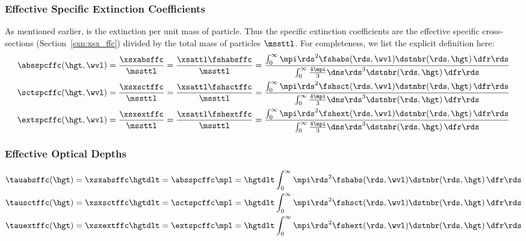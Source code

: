\documentclass[12pt]{article}
\begin{document}
\subsubsection[Effective Specific Extinction Coefficients]{Effective Specific Extinction Coefficients}\label{sxn:mac_ffc}
As mentioned earlier,  is the extinction
per unit mass of particle.
Thus the specific extinction coefficients are the effective specific
cross-sections (Section~\ref{sxn:xsx_ffc}) divided by the total mass
of particles $\mssttl$.
For completeness, we list the explicit definition here:
\begin{subequations}
\label{eqn:spc_ffc}
\begin{align}
\label{eqn:abs_spc_ffc}
\absspcffc(\hgt,\wvl) & = \frac{\xsxabsffc}{\mssttl} = 
\frac{\xsattl \fshabsffc}{\mssttl} =
\frac{\int_{0}^{\infty}
\mpi \rds^{2} \fshabs(\rds,\wvl) \dstnbr(\rds,\hgt) \,\dfr\rds}
{\int_{0}^{\infty}
\frac{4\mpi}{3} \dns \rds^{3} \dstnbr(\rds,\hgt) \,\dfr\rds} \\
\label{eqn:sct_spc_ffc}
\sctspcffc(\hgt,\wvl) & = \frac{\xsxsctffc}{\mssttl} = 
\frac{\xsattl \fshsctffc}{\mssttl} =
\frac{\int_{0}^{\infty}
\mpi \rds^{2} \fshsct(\rds,\wvl) \dstnbr(\rds,\hgt) \,\dfr\rds}
{\int_{0}^{\infty}
\frac{4\mpi}{3} \dns \rds^{3} \dstnbr(\rds,\hgt) \,\dfr\rds} \\
\label{eqn:ext_spc_ffc}
\extspcffc(\hgt,\wvl) & = \frac{\xsxextffc}{\mssttl} = 
\frac{\xsattl \fshextffc}{\mssttl} =
\frac{\int_{0}^{\infty}
\mpi \rds^{2} \fshext(\rds,\wvl) \dstnbr(\rds,\hgt) \,\dfr\rds}
{\int_{0}^{\infty}
\frac{4\mpi}{3} \dns \rds^{3} \dstnbr(\rds,\hgt) \,\dfr\rds}
\end{align}
\end{subequations}

\subsubsection[Effective Optical Depths]{Effective Optical Depths}\label{sxn:tau_ffc}
\begin{subequations}
\label{eqn:tau_ffc}
\begin{align}
\label{eqn:tau_abs_ffc}
\tauabsffc(\hgt) & = \xsxabsffc \hgtdlt = \absspcffc \mpl =
\hgtdlt \int_{0}^{\infty}
\mpi \rds^{2} \fshabs(\rds,\wvl) \dstnbr(\rds,\hgt) \,\dfr\rds \\
\label{eqn:tau_sct_ffc}
\tausctffc(\hgt) & = \xsxsctffc \hgtdlt = \sctspcffc \mpl =
\hgtdlt \int_{0}^{\infty}
\mpi \rds^{2} \fshsct(\rds,\wvl) \dstnbr(\rds,\hgt) \,\dfr\rds \\
\label{eqn:tau_ext_ffc}
\tauextffc(\hgt) & = \xsxextffc \hgtdlt = \extspcffc \mpl =
\hgtdlt \int_{0}^{\infty}
\mpi \rds^{2} \fshext(\rds,\wvl) \dstnbr(\rds,\hgt) \,\dfr\rds
\end{align}
\end{subequations}
\end{document}

